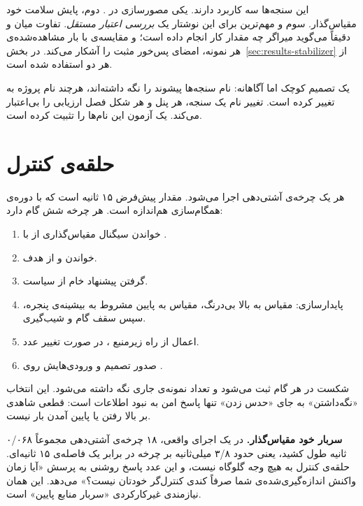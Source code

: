 این سنجه‌ها سه کاربرد دارند. یکی مصورسازی در . دوم، پایش سلامت خود مقیاس‌گذار.
سوم \mdash{} و مهم‌ترین برای این نوشتار \mdash{} یک \emph{بررسی اعتبار مستقل}. تفاوت میان
 و  دقیقاً می‌گوید
میراگر چه مقدار کار انجام داده است؛ و مقایسه‌ی  با بار
مشاهده‌شده‌ی هر نمونه، امضای پس‌خور مثبت را آشکار می‌کند. در
بخش~\ref{sec:results-stabilizer} از هر دو استفاده شده است.

یک تصمیم کوچک اما آگاهانه: نام سنجه‌ها پیشوند  را نگه داشته‌اند، هرچند نام
پروژه به  تغییر کرده است. تغییر نام یک سنجه، هر پنل  و هر شکل
فصل ارزیابی را بی‌اعتبار می‌کند. یک آزمون این نام‌ها را تثبیت کرده است.

\section{حلقه‌ی کنترل}
\label{sec:design-loop}

هر  یک چرخه‌ی آشتی‌دهی اجرا می‌شود. مقدار پیش‌فرض ۱۵ ثانیه است که با
دوره‌ی همگام‌سازی  هم‌اندازه است. هر چرخه شش گام دارد:

\begin{enumerate}
  \item خواندن سیگنال مقیاس‌گذاری از  با .
  \item خواندن  و  از هدف.
  \item گرفتن پیشنهاد خام از سیاست.
  \item پایدارسازی: مقیاس به بالا بی‌درنگ، مقیاس به پایین مشروط به بیشینه‌ی پنجره، سپس سقف
  گام و شیب‌گیری.
  \item اعمال از راه زیرمنبع ، در صورت تغییر عدد.
  \item صدور تصمیم و ورودی‌هایش روی .
\end{enumerate}

شکست در هر گام ثبت می‌شود و تعداد نمونه‌ی جاری نگه داشته می‌شود. این انتخاب \mdash{} «نگه‌داشتن» به
جای «حدس زدن» \mdash{} تنها پاسخ امن به نبود اطلاعات است: قطعی  شاهدی بر بالا رفتن یا
پایین آمدن بار نیست.

\textbf{سربار خود مقیاس‌گذار.} در یک اجرای واقعی، ۱۸ چرخه‌ی آشتی‌دهی مجموعاً ۰/۰۶۸ ثانیه طول
کشید، یعنی حدود ۳/۸ میلی‌ثانیه بر چرخه در برابر یک فاصله‌ی ۱۵ ثانیه‌ای. حلقه‌ی کنترل به هیچ
وجه گلوگاه نیست، و این عدد پاسخ روشنی به پرسش «آیا زمان واکنش اندازه‌گیری‌شده‌ی شما صرفاً
کندی کنترل‌گر خودتان نیست؟» می‌دهد. این همان نیازمندی غیرکارکردی «سربار منابع پایین» است.

